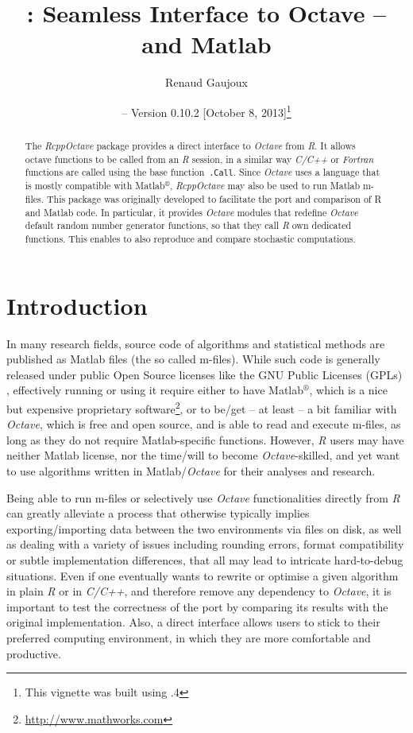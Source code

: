\documentclass[english,10pt,a4paper]{article}\usepackage[]{graphicx}\usepackage[]{color}
\author{Renaud Gaujoux}
\title{\pkgname{RcppOctave}: Seamless Interface to Octave -- and Matlab}
\date{\Rpkg{RcppOctave} -- Version 0.10.2
[October  8, 2013]\footnote{This vignette was built using \octave
3.6.4}}
\newcommand{\matlab}{Matlab$^\circledR$\xspace}
\let\proglang=\textit
\let\code=\texttt
\newcommand{\pkgname}[1]{\textit{#1}\xspace}
\newcommand{\Rpkg}[1]{\pkgname{#1} package\xspace}
\newcommand{\R}{\proglang{R}\xspace}
\newcommand{\octave}{\proglang{Octave}\xspace}
\begin{document}
\maketitle

\begin{abstract}
The \Rpkg{RcppOctave} provides a direct interface to \octave from
\R.
It allows \\octave functions to be called from an \R session,
in a similar way \proglang{C/C++} or \proglang{Fortran} functions are called using the base function~\code{.Call}.
Since \octave uses a language that is mostly compatible with \matlab,
\pkgname{RcppOctave} may also be used to run Matlab m-files.
This package was originally developed to facilitate the port and comparison of R
and Matlab code.
In particular, it provides \octave modules that redefine
\octave default random number generator functions, so that they call
\proglang{R} own dedicated functions.
This enables to also reproduce and compare stochastic computations.
\end{abstract}

\noindent\hrulefill
\tableofcontents
\noindent\hrulefill

\section{Introduction}

In many research fields, source code of algorithms and statistical methods are
published as Matlab files (the so called m-files).
While such code is generally released under public Open Source licenses like the
GNU Public Licenses (GPLs) \cite{gnuGPL}, effectively running or using it
require either to have \matlab, which is a nice but expensive proprietary
software\footnote{\url{http://www.mathworks.com}}, or to be/get -- at least -- a bit familiar with \octave \cite{Eaton2002}, which is free and open source, and is able to read and execute m-files, as long as they do not require Matlab-specific functions.
However, \proglang{R} users may have neither Matlab license, nor the
time/will to become \octave-skilled, and yet want to use algorithms written in
Matlab/\octave for their analyses and research.

Being able to run m-files or selectively use \octave functionalities
directly from \proglang{R} can greatly alleviate a process that otherwise
typically implies exporting/importing data between the two environments via
files on disk, as well as dealing with a variety of issues including
rounding errors, format compatibility or subtle implementation differences,
that all may lead to intricate hard-to-debug situations.
Even if one eventually wants to rewrite or optimise a given algorithm in plain
\proglang{R} or in \proglang{C/C++}, and therefore remove any dependency to
\octave, it is important to test the correctness of the port by
comparing its results with the original implementation.
Also, a direct interface allows users to stick to their preferred computing
environment, in which they are more comfortable and productive.
\end{document}
